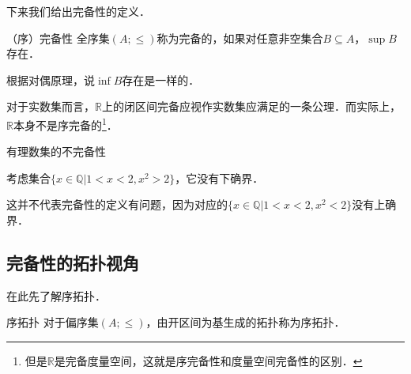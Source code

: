 下来我们给出完备性的定义．

\begin{definition}{（序）完备性}
全序集$(A;\leq)$称为完备的，如果对任意非空集合$B\subseteq A$，$\sup B$存在．
\end{definition}

根据对偶原理，说$\inf B$存在是一样的．

对于实数集而言，$\mathbb{R}$上的闭区间完备应视作实数集应满足的一条公理．而实际上，$\mathbb{R}$本身不是序完备的\footnote{但是$\mathbb{R}$是完备度量空间，这就是序完备性和度量空间完备性的区别．}．

\begin{example}{有理数集的不完备性}

考虑集合$\{x\in\mathbb{Q}|1<x<2,x^2>2\}$，它没有下确界．

这并不代表完备性的定义有问题，因为对应的$\{x\in\mathbb{Q}|1<x<2,x^2<2\}$没有上确界．
\end{example}

\subsection{完备性的拓扑视角}


在此先了解序拓扑．

\begin{definition}{序拓扑}
对于偏序集$(A;\leq)$，由开区间为基生成的拓扑称为序拓扑．
\end{definition}

